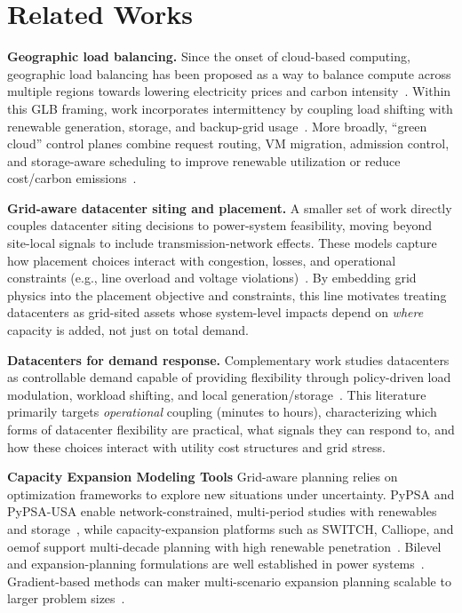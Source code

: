 \section{Related Works}

\noindent\textbf{Geographic load balancing.}
Since the onset of cloud-based computing, geographic load balancing has been proposed as a way to balance compute across multiple regions towards lowering electricity prices and carbon intensity~\cite{qureshi2009cutting,liu2015greening}.
Within this GLB framing, work incorporates intermittency by coupling load shifting with renewable generation, storage, and backup-grid usage~\cite{liu2011geoloadbalance,goiri2011greenslot,berral2014buildinggreencloud}.
More broadly, “green cloud” control planes combine request routing, VM migration, admission control, and storage-aware scheduling to improve renewable utilization or reduce cost/carbon emissions~\cite{zhang2011greenware,radovanovic2023carbonaware, johnson2025signalawareworkloadshiftingalgorithms}.

\noindent\textbf{Grid-aware datacenter siting and placement.}
A smaller set of work directly couples datacenter siting decisions to power-system feasibility, moving beyond site-local signals to include transmission-network effects.
These models capture how placement choices interact with congestion, losses, and operational constraints (e.g., line overload and voltage violations)~\cite{goiri2011intelligentplacement,wang2015griddcwind}.
By embedding grid physics into the placement objective and constraints, this line motivates treating datacenters as grid-sited assets whose system-level impacts depend on \emph{where} capacity is added, not just on total demand.

\noindent\textbf{Datacenters for demand response.}
Complementary work studies datacenters as controllable demand capable of providing flexibility through policy-driven load modulation, workload shifting, and local generation/storage~\cite{irwin2011continuousdr,liu2013coincidentpeak}.
This literature primarily targets \emph{operational} coupling (minutes to hours), characterizing which forms of datacenter flexibility are practical, what signals they can respond to, and how these choices interact with utility cost structures and grid stress.

\noindent\textbf{Capacity Expansion Modeling Tools}
Grid-aware planning relies on optimization frameworks to explore new situations under uncertainty.
PyPSA and PyPSA-USA enable network-constrained, multi-period studies with renewables and storage~\cite{PyPSA,tehranchi5029120pypsa}, while capacity-expansion platforms such as SWITCH, Calliope, and oemof support multi-decade planning with high renewable penetration~\cite{nelson2012switch,johnston2019switch2,pfenninger2018calliope,hilpert2018oemof}.
Bilevel and expansion-planning formulations are well established in power systems~\cite{baringo2011wind}. Gradient-based methods can maker multi-scenario expansion planning scalable to larger problem sizes~\cite{degleris2024gradient,degleris2024gpu}.